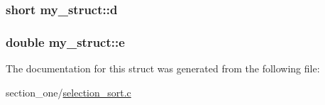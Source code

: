 \subsubsection[{\texorpdfstring{d}{d}}]{\setlength{\rightskip}{0pt plus 5cm}short my\+\_\+struct\+::d}\hypertarget{structmy__struct_a070f65ff028122289f47c2614f29092d}{}\label{structmy__struct_a070f65ff028122289f47c2614f29092d}
\subsubsection[{\texorpdfstring{e}{e}}]{\setlength{\rightskip}{0pt plus 5cm}double my\+\_\+struct\+::e}\hypertarget{structmy__struct_ac7cf32e3d2727484991537391c3c2f83}{}\label{structmy__struct_ac7cf32e3d2727484991537391c3c2f83}


The documentation for this struct was generated from the following file\+:\begin{DoxyCompactItemize}
\item 
section\+\_\+one/\hyperlink{selection__sort_8c}{selection\+\_\+sort.\+c}\end{DoxyCompactItemize}
